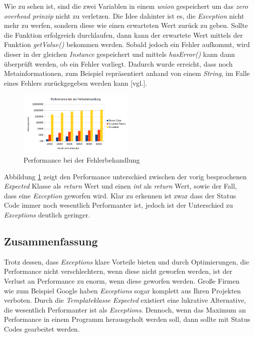 Wie zu sehen ist, sind die zwei Variablen in einem \emph{union} gespeichert um das \emph{zero
overhead prinzip} nicht zu verletzen. Die Idee dahinter ist es, die \emph{Exception} nicht mehr
zu werfen, sondern diese wie einen erwarteten Wert zurück zu geben. Sollte die Funktion
erfolgreich durchlaufen, dann kann der erwartete Wert mittels der Funktion \emph{getValue()}
bekommen werden. Sobald jedoch ein Fehler aufkommt, wird dieser in der gleichen \emph{Instance}
gespeichert und mittels \emph{hasError()} kann dann überprüft werden, ob ein Fehler vorliegt.
Dadurch wurde erreicht, dass noch Metainformationen, zum Beispiel repräsentiert anhand von einem
\emph{String}, im Falle eines Fehlers zurückgegeben werden kann \cite{OverheadExceptions}[vgl.].
\newline

\begin{figure}[h]
    \centering
    \includegraphics[width=0.5\textwidth]{bilder/Performance_Fehlerbehandlung}
    \caption[Fehlerbehandlung]{Performance bei der Fehlerbehandlung}
    \label{img:fehlerbehandlung}
\end{figure}

Abbildung \ref{img:fehlerbehandlung} zeigt den Performance unterschied zwischen der vorig
besprochenen \emph{Expected} Klasse als \emph{return} Wert und einen \emph{int} als \emph{return}
Wert, sowie der Fall, dass eine \emph{Exception} geworfen wird. Klar zu erkennen ist zwar dass
der Status Code immer noch wesentlich Performanter ist, jedoch ist der Unterschied zu
\emph{Exceptions} deutlich geringer.

\subsection{Zusammenfassung}
Trotz dessen, dass \emph{Exceptions} klare Vorteile bieten und durch Optimierungen, die
Performance nicht verschlechtern, wenn diese nicht geworfen werden, ist der Verlust an
Performance zu enorm, wenn diese geworfen werden. Große Firmen wie zum Beispiel Google haben
\emph{Exceptions} sogar komplett aus Ihren Projekten verboten. Durch die \emph{Templateklasse}
\emph{Expected} existiert eine lukrative Alternative, die wesentlich Performanter ist als
\emph{Exceptions}. Dennoch, wenn das Maximum an Performance in einem Programm herausgeholt werden
soll, dann sollte mit Status Codes gearbeitet werden.